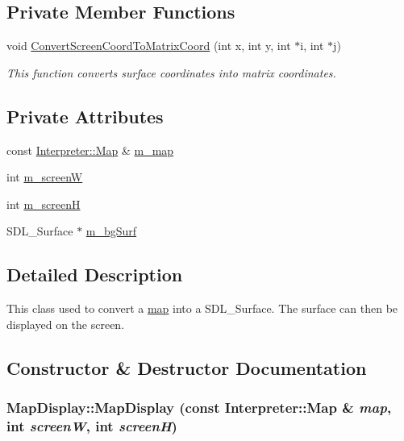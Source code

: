 \subsection*{Private Member Functions}
\begin{DoxyCompactItemize}
\item 
void \hyperlink{classMapDisplay_afd0ef9d9c11103bd966d27a12cd84ed7}{ConvertScreenCoordToMatrixCoord} (int x, int y, int $\ast$i, int $\ast$j)
\begin{DoxyCompactList}\small\item\em This function converts surface coordinates into matrix coordinates. \item\end{DoxyCompactList}\end{DoxyCompactItemize}
\subsection*{Private Attributes}
\begin{DoxyCompactItemize}
\item 
const \hyperlink{classMatrix}{Interpreter::Map} \& \hyperlink{classMapDisplay_a218c5b07ae7b9622a606faa613d7eaa9}{m\_\-map}
\item 
int \hyperlink{classMapDisplay_a31f9d5788c440d1ef0fca5729103ab05}{m\_\-screenW}
\item 
int \hyperlink{classMapDisplay_a3a6a2f7b6501945628fbfe022914daed}{m\_\-screenH}
\item 
SDL\_\-Surface $\ast$ \hyperlink{classMapDisplay_a8c4cc4b6d6a5f1608ca2a3eb9a5e3290}{m\_\-bgSurf}
\end{DoxyCompactItemize}


\subsection{Detailed Description}
This class used to convert a \hyperlink{classInterpreter_a4c080f069f557cf92dfe803117a6ea53}{map} into a SDL\_\-Surface. The surface can then be displayed on the screen. 

\subsection{Constructor \& Destructor Documentation}
\hypertarget{classMapDisplay_a3af0dfed1bf4e41a1fe810271593729d}{
\subsubsection[{MapDisplay}]{\setlength{\rightskip}{0pt plus 5cm}MapDisplay::MapDisplay (const {\bf Interpreter::Map} \& {\em map}, \/  int {\em screenW}, \/  int {\em screenH})}}
\label{classMapDisplay_a3af0dfed1bf4e41a1fe810271593729d}



